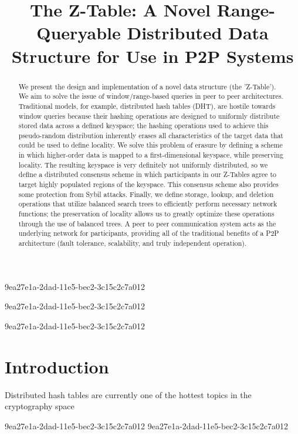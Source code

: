 \documentclass[12pt]{article}
\title{The Z-Table: A Novel Range-Queryable Distributed Data Structure for Use in P2P Systems}
\begin{document}
9ea27e1a-2dad-11e5-bec2-3c15c2c7a012
\maketitle
9ea27e1a-2dad-11e5-bec2-3c15c2c7a012
\begin{abstract}
We present the design and implementation of a novel data structure (the 'Z-Table'). We aim to solve the issue of window/range-based queries in peer to peer architectures. Traditional models, for example,  distributed hash tables (DHT), are hostile towards window queries because their hashing operations are designed to uniformly distribute stored data across a defined keyspace; the hashing operations used to achieve this pseudo-random distribution inherently erases all characteristics of the target data that could be used to define locality. We solve this problem of erasure by defining a scheme in which higher-order data is mapped to a first-dimensional keyspace, while preserving locality. The resulting keyspace is very definitely not uniformly distributed, so we define a distributed consensus scheme in which participants in our Z-Tables agree to target highly populated regions of the keyspace. This consensus scheme also provides some protection from Sybil attacks. Finally, we define storage, lookup, and deletion operations that utilize balanced search trees to efficiently perform necessary network functions; the preservation of locality allows us to greatly optimize these operations through the use of balanced trees. A peer to peer communication system acts as the underlying network for participants, providing all of the traditional benefits of a P2P architecture (fault tolerance, scalability, and truly independent operation).
\end{abstract}


\newpage
9ea27e1a-2dad-11e5-bec2-3c15c2c7a012\section{Introduction}
Distributed hash tables are currently one of the hottest topics in the cryptography space~\cite{Stoica:2001dj,Rowstron:2001ea,Ratnasamy:2001wn}

9ea27e1a-2dad-11e5-bec2-3c15c2c7a012\printbibliography
9ea27e1a-2dad-11e5-bec2-3c15c2c7a012
\end{document}
